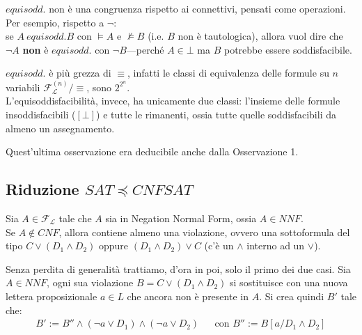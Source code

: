 \begin{ossn}
$equisodd.$ non è una congruenza rispetto ai connettivi, pensati come operazioni. \\
Per esempio, rispetto a $\neg$: \\
se $A\ equisodd. B$ con $\models A$ e $\nvDash B$ (i.e. $B$ non è tautologica), allora vuol dire che $\neg A$ \textbf{non} è $equisodd.$ con $\neg B$—perché $A \in \bot$ ma $B$ potrebbe essere soddisfacibile.
\end{ossn}

\begin{ossn} $equisodd.$ è più grezza di $\equiv$, infatti le classi di equivalenza delle formule su $n$ variabili $\mathscr{F}_\mathscr{L}^{(n)}/\equiv$, sono $2^{2^n}$. \\
L'equisoddisfacibilità, invece, ha unicamente due classi: l'insieme delle formule insoddisfacibili ($[\bot]$) e tutte le rimanenti, ossia tutte quelle soddisfacibili da almeno un assegnamento.
\end{ossn}
Quest'ultima osservazione era deducibile anche dalla Osservazione 1.

\subsection{Riduzione $SAT \preceq CNFSAT$}
Sia $A \in \mathscr{F}_\mathscr{L}$ tale che $A$ sia in Negation Normal Form, ossia $A \in NNF$. \\
Se $A \notin CNF$, allora contiene almeno una violazione, ovvero una sottoformula del tipo $C \lor (D_1 \land D_2)$ oppure $(D_1 \land D_2) \lor C$ (c'è un $\land$ interno ad un $\lor$).

Senza perdita di generalità trattiamo, d'ora in poi, solo il primo dei due casi. Sia $A \in NNF$, ogni sua violazione $B = C \lor (D_1 \land D_2)$ si sostituisce con una nuova lettera proposizionale $a \in L$ che ancora non è presente in $A$. Si crea quindi $B'$ tale che:
\begin{align*}
B' := B'' \land (\neg a \lor D_1) \land (\neg a \lor D_2)
&&
\text{con } B'' := B[a/D_1\land D_2]
\end{align*}

